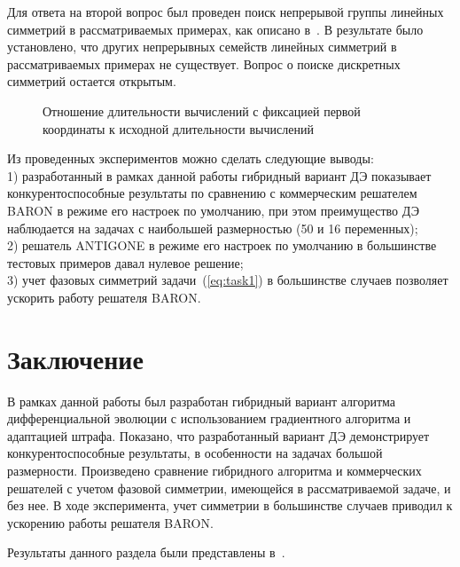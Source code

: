 Для ответа на второй вопрос был проведен поиск непрерывой группы линейных симметрий в рассматриваемых примерах,
как описано в~\cite{yurkov:symmetry}. В результате было установлено, что других непрерывных семейств линейных
симметрий в рассматриваемых примерах не существует. Вопрос о поиске дискретных симметрий остается открытым.

\begin{figure}
\caption{Отношение длительности вычислений с фиксацией первой координаты к исходной длительности вычислений}
\label{ris:ring}
\end{figure}

Из проведенных экспериментов можно сделать следующие выводы:\\
1) разработанный в рамках данной работы гибридный вариант ДЭ показывает конкурентоспособные результаты по сравнению с коммерческим решателем BARON в режиме его настроек по умолчанию, при этом преимущество ДЭ наблюдается на задачах с наибольшей размерностью (50 и 16 переменных);\\
2) решатель ANTIGONE в режиме его настроек по умолчанию в большинстве тестовых примеров давал нулевое решение;\\
3) учет фазовых симметрий задачи~(\ref{eq:task1}) в большинстве случаев позволяет ускорить работу решателя BARON.\\

\section{Заключение}\label{sec:conclusion}

В рамках данной работы был разработан гибридный вариант алгоритма дифференциальной эволюции с использованием
градиентного алгоритма и адаптацией штрафа. Показано, что разработанный вариант ДЭ демонстрирует конкурентоспособные результаты, в
особенности на задачах большой размерности. Произведено сравнение гибридного алгоритма и коммерческих решателей с
учетом фазовой симметрии, имеющейся в рассматриваемой задаче, и без нее. В ходе эксперимента, учет симметрии в большинстве
случаев приводил к ускорению работы решателя BARON.

Результаты данного раздела были представлены в~\cite{tyu:msim22,tyu:reis}.

